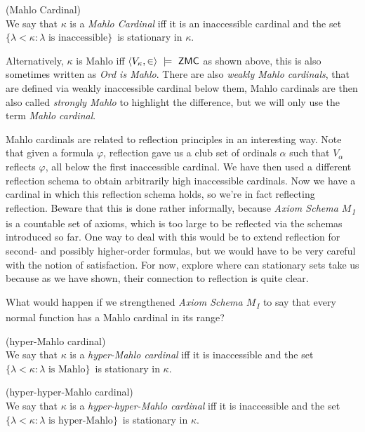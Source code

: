 \begin{definition}{(Mahlo Cardinal)}\label{def:mahlo_cardinal}\\
We say that $\kappa$ is a \emph{Mahlo Cardinal} iff it is an inaccessible cardinal and the set $\{\lambda < \kappa : \lambda \mbox{ is inaccessible}\}$ is stationary in $\kappa$.
\end{definition}

Alternatively, $\kappa$ is Mahlo iff $\langle V_\kappa, \in \rangle~\models~\sf{ZMC}$ as shown above, this is also sometimes written as \emph{Ord is Mahlo}. There are also \emph{weakly Mahlo cardinals}, that are defined via weakly inaccessible cardinal below them, Mahlo cardinals are then also called \emph{strongly Mahlo} to highlight the difference, but we will only use the term \emph{Mahlo cardinal}.

Mahlo cardinals are related to reflection principles in an interesting way. Note that given a formula $\varphi$, reflection gave us a club set of ordinals $\alpha$ such that $V_\alpha$ reflects $\varphi$, all below the first inaccessible cardinal. We have then used a different reflection schema to obtain arbitrarily high inaccessible cardinals. Now we have a cardinal in which this reflection schema holds, so we're in fact reflecting reflection. Beware that this is done rather informally, because \emph{Axiom Schema $M$\textsubscript{1}} is a countable set of axioms, which is too large to be reflected via the schemas introduced so far. One way to deal with this would be to extend reflection for second- and possibly higher-order formulas, but we would have to be very careful with the notion of satisfaction. For now, explore where can stationary sets take us because as we have shown, their connection to reflection is quite clear.

What would happen if we strengthened \emph{Axiom Schema $M$\textsubscript{1}} to say that every normal function has a Mahlo cardinal in its range?

\begin{definition}{(hyper-Mahlo cardinal)}\label{def:hyper_mahlo_cardinal}\\
We say that $\kappa$ is a \emph{hyper-Mahlo cardinal} iff it is inaccessible and the set $\{\lambda < \kappa : \lambda \mbox{ is Mahlo}\}$ is stationary in $\kappa$.
\end{definition}

\begin{definition}{(hyper-hyper-Mahlo cardinal)}\label{def:hyper_hyper_mahlo_cardinal}\\
We say that $\kappa$ is a \emph{hyper-hyper-Mahlo cardinal} iff it is inaccessible and the set $\{\lambda < \kappa : \lambda \mbox{ is hyper-Mahlo}\}$ is stationary in $\kappa$.
\end{definition}

